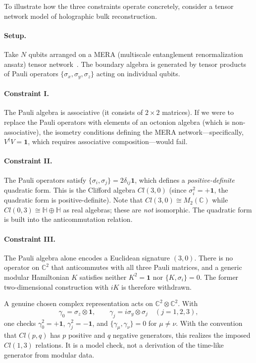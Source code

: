\documentclass[12pt]{article}
\begin{document}
To illustrate how the three constraints operate concretely, consider a tensor network model of holographic bulk reconstruction.

\paragraph{Setup.}
Take $N$ qubits arranged on a MERA (multiscale entanglement renormalization ansatz) tensor network~\cite{Swingle2012,Vidal2008}.
The boundary algebra is generated by tensor products of Pauli operators $\{\sigma_x, \sigma_y, \sigma_z\}$ acting on individual qubits.

\paragraph{Constraint I.}
The Pauli algebra is associative (it consists of $2 \times 2$ matrices).
If we were to replace the Pauli operators with elements of an octonion algebra (which is non-associative), the isometry conditions defining the MERA network---specifically, $V^\dagger V = \mathbf{1}$, which requires associative composition---would fail.

\paragraph{Constraint II.}
The Pauli operators satisfy $\{\sigma_i, \sigma_j\} = 2\delta_{ij}\mathbf{1}$, which defines a \emph{positive-definite} quadratic form.
This is the Clifford algebra $Cl(3,0)$ (since $\sigma_i^2 = +\mathbf{1}$, the quadratic form is positive-definite).
Note that $Cl(3,0) \cong M_2(\mathbb{C})$ while $Cl(0,3) \cong \mathbb{H} \oplus \mathbb{H}$ as real algebras; these are \emph{not} isomorphic.
The quadratic form is built into the anticommutation relation.

\paragraph{Constraint III.}
The Pauli algebra alone encodes a Euclidean signature $(3,0)$.
There is no operator on $\mathbb C^2$ that anticommutes with all three Pauli matrices, and a generic modular Hamiltonian $K$ satisfies neither $K^2=\mathbf1$ nor $\{K,\sigma_i\}=0$.  The former two-dimensional construction with $iK$ is therefore withdrawn.

A genuine chosen complex representation acts on $\mathbb C^2\otimes\mathbb C^2$.  With
\begin{equation}
\gamma_0=\sigma_z\otimes\mathbf1,\qquad
\gamma_j=i\sigma_y\otimes\sigma_j\quad(j=1,2,3),
\end{equation}
one checks $\gamma_0^2=+\mathbf1$, $\gamma_j^2=-\mathbf1$, and $\{\gamma_\mu,\gamma_\nu\}=0$ for $\mu\ne\nu$.  With the convention that $Cl(p,q)$ has $p$ positive and $q$ negative generators, this realizes the imposed $Cl(1,3)$ relations.  It is a model check, not a derivation of the time-like generator from modular data.
\end{document}
